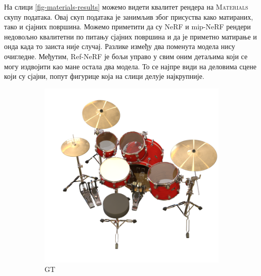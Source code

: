 \documentclass[12pt, a4paper, twoside]{book}
\numberwithin{equation}{chapter}
\numberwithin{theorem}{section}
\numberwithin{definition}{section}
\numberwithin{definitionChapter}{chapter}
\begin{document}
На слици \ref{fig-materials-results} можемо видети квалитет рендера на \textsc{Materials} скупу података.
Овај скуп података је занимљив због присуства како матираних, тако и сјајних површина. Можемо приметити 
да су NeRF и mip-NeRF рендери недовољно квалитетни по питању сјајних површина и да је приметно матирање
и онда када то заиста није случај. Разлике између два поменута модела нису очигледне. Међутим, Ref-NeRF
је бољи управо у свим оним детаљима који се могу издвојити као мане остала два модела. То се најпре види
на деловима сцене који су сјајни, попут фигурице која на слици делује најкрупније.


	\begin{figure}[H]
		\centering
		\begin{subfigure}{0.475\textwidth}
			\centering
			\includegraphics[scale=0.25]{img/gt/gt_drums_3.png}
			\caption{GT}
		\end{subfigure}
		\begin{subfigure}{0.475\textwidth}
			\centering

\end{subfigure}
\end{figure}
\end{document}
